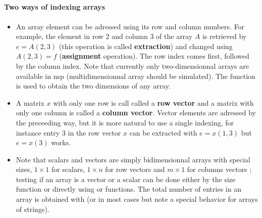 
\begin{mandesc}
   \\
   \\
   \\
\end{mandesc}

\paragraph{Two ways of indexing arrays}
\begin{itemize}

\item  An array element can be adressed using its row 
 and column numbers. For example, the element in row 2
 and column 3 of the array $A$ is retrieved by
 $e = A(2,3)$ (this operation is called {\bf extraction}) 
and changed using $A(2,3) = f$ ({\bf assignment} operation). 
The row  index comes first, followed by the column index. 
Note that currently only two-dimensionnal arrays are available in nsp
(multidimensionnal array should be simulated).
The function  is used to obtain the two dimensions
of any array.

\item A matrix $x$ with only one row is call called a {\bf row vector} 
and a matrix with only one column is called a {\bf column vector}. 
Vector elements are adressed by the preceeding way, but it is more natural
 to use a single indexing, for instance entry 3 in the
 row vector $x$ can be extracted with $e = x(1,3)$ but $e = x(3)$ works. 

\item Note that scalars and vectors are simply bidimensionnal 
arrays with special sizes, $1 \times 1$ for scalars, $1 \times n$ for
row vectors and  $m \times 1$ for columns vectors ; testing if an array
is a vector or a scalar can be done either by the size function
or directly using  or 
functions. The total number of entries in an array is obtained with
 (or  in most cases but
note a special behavior for arrays of strings).



\end{itemize}
